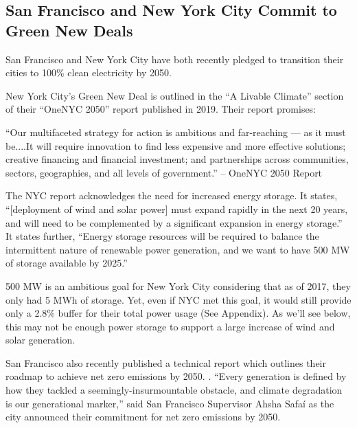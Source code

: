 \documentclass[hidelinks,12pt,a4paper]{article}
\begin{document}
\subsection{San Francisco and New York City Commit to Green New Deals}
San Francisco and New York City have both recently pledged to transition their cities to 100\% clean electricity by 2050. \cite{SFNetZeroBy2050} \cite{ActionOnGlobalWarmingNYCsGreenNewDeal}

New York City's Green New Deal is outlined in the “A Livable Climate” section of their “OneNYC 2050” report published in 2019. Their report promises:

\begin{displayquote}
“Our multifaceted strategy for action is ambitious and far-reaching — as it must be....It will require innovation to find less expensive and more effective solutions; creative financing and financial investment; and partnerships across communities, sectors, geographies, and all levels of government.” \cite{OneNYC2050FullReport} -- OneNYC 2050 Report
\end{displayquote}

The NYC report acknowledges the need for increased energy storage. It states, “[deployment of wind and solar power] must expand rapidly in the next 20 years, and will need to be complemented by a significant expansion in energy storage.” \cite{OneNYC2050FullReport} It states further, “Energy storage resources will be required to balance the intermittent nature of renewable power generation, and we want to have 500 MW of storage available by 2025.”

500 MW is an ambitious goal for New York City considering that as of 2017, they only had 5 MWh of storage\cite{NYEnergyStorageTargetTheJourneyNotTheDestination}. Yet, even if NYC met this goal, it would still provide only a 2.8\% buffer for their total power usage (See Appendix). As we'll see below, this may not be enough power storage to support a large increase of wind and solar generation.

San Francisco also recently published a technical report which outlines their roadmap to achieve net zero emissions by 2050. \cite{Focus2030APathwaytoNetZeroEmissions}. “Every generation is defined by how they tackled a seemingly-insurmountable obstacle, and climate degradation is our generational marker,” said San Francisco Supervisor Ahsha Safaí as the city announced their commitment for net zero emissions by 2050.\cite{SanFranciscoMayor100PercentRenewableElectricity}
\end{document}
